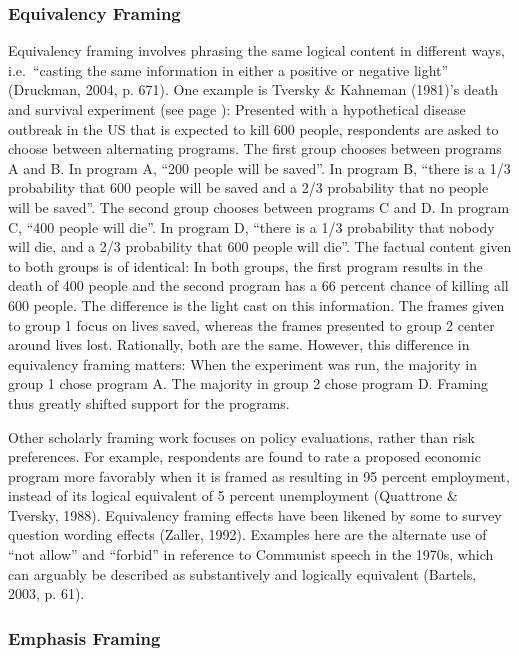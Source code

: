 \documentclass[12pt,econ]{sources/authesis}
\begin{document}
\hypertarget{framing-theory-framing-equiv}{%
\subsubsection{Equivalency Framing}\label{framing-theory-framing-equiv}}

Equivalency framing involves phrasing the same logical content in different ways, i.e.~``casting the same information in either a positive or negative light'' (Druckman, 2004, p. 671). One example is Tversky \& Kahneman (1981)'s death and survival experiment (see page \pageref{death}): Presented with a hypothetical disease outbreak in the US that is expected to kill 600 people, respondents are asked to choose between alternating programs. The first group chooses between programs A and B. In program A, ``200 people will be saved''. In program B, ``there is a 1/3 probability that 600 people will be saved and a 2/3 probability that no people will be saved''. The second group chooses between programs C and D. In program C, ``400 people will die''. In program D, ``there is a 1/3 probability that nobody will die, and a 2/3 probability that 600 people will die''. The factual content given to both groups is of identical: In both groups, the first program results in the death of 400 people and the second program has a 66 percent chance of killing all 600 people. The difference is the light cast on this information. The frames given to group 1 focus on lives saved, whereas the frames presented to group 2 center around lives lost. Rationally, both are the same. However, this difference in equivalency framing matters: When the experiment was run, the majority in group 1 chose program A. The majority in group 2 chose program D. Framing thus greatly shifted support for the programs.

Other scholarly framing work focuses on policy evaluations, rather than risk preferences. For example, respondents are found to rate a proposed economic program more favorably when it is framed as resulting in 95 percent employment, instead of its logical equivalent of 5 percent unemployment (Quattrone \& Tversky, 1988). Equivalency framing effects have been likened by some to survey question wording effects (Zaller, 1992). Examples here are the alternate use of ``not allow'' and ``forbid'' in reference to Communist speech in the 1970s, which can arguably be described as substantively and logically equivalent (Bartels, 2003, p. 61).

\hypertarget{framing-theory-framing-emph}{%
\subsubsection{Emphasis Framing}\label{framing-theory-framing-emph}}
\end{document}
